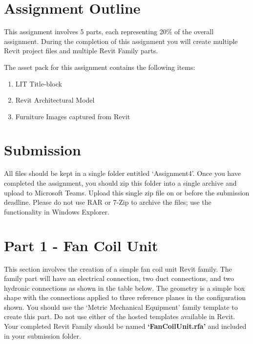 \section*{Assignment Outline}
This assignment involves 5 parts, each representing 20\% of the overall assignment. During the completion of this assignment you will create multiple Revit project files and multiple Revit Family parts.


The asset pack for this assignment contains the following items:
\begin{enumerate}
	\item LIT Title-block
	\item Revit Architectural Model
	\item Furniture Images captured from Revit
\end{enumerate}


\section*{Submission}
All files should be kept in a single folder entitled ‘Assignment4’. Once you have completed the assignment, you should zip this folder into a single archive and upload to Microsoft Teams. Upload this single zip file on or before the submission deadline.  Please do not use RAR or 7-Zip to archive the files; use the functionality in Windows Explorer.





\newpage

\section*{Part 1 - Fan Coil Unit}
This section involves the creation of a simple fan coil unit Revit family. The family part will have an electrical connection, two duct connections, and two hydronic connections as shown in the table below. The geometry is a simple box shape with the connections applied to three reference planes in the configuration shown. You should use the ‘Metric Mechanical Equipment’ family template to create this part. Do not use either of the hosted templates available in Revit.  Your completed Revit Family should be named \textbf{‘FanCoilUnit.rfa’} and included in your submission folder.\\

